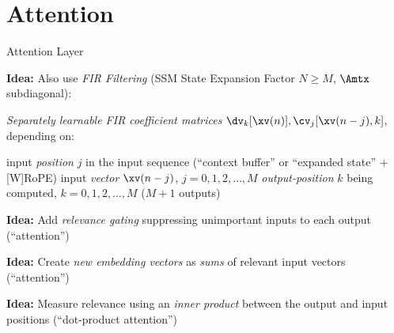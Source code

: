 \section[\sectopts,toc={Attention}]{Attention}

\begin{slide}[\slideopts,toc={Attention}]{Attention Layer}

\vspace{-1em}

\textbf{Idea:} Also use \emph{FIR Filtering} (SSM State Expansion Factor $N\ge M$, $\Amtx$ subdiagonal):



\vspace{-1em}

\emph{Separately learnable FIR coefficient matrices} $\dv_k[\xv(n)], \cv_j[\xv(n-j),k]$, depending on:
  \begin{enumerate}
    \mpitem input \emph{position} $j$ in the input sequence (``context buffer'' or ``expanded state'' + [W]RoPE)
    \mpitem input \emph{vector} $\xv(n-j)$,\; $j=0,1,2,\dots,M$
    \mpitem \emph{output-position} $k$ being computed,\; $k=0,1,2,\dots,M$ ($M+1$ outputs)
  \end{enumerate}

\maybepause
\textbf{Idea:} Add \emph{relevance gating} suppressing unimportant inputs to each output (``attention'')

\vspace{0.2em}

\maybepause
\textbf{Idea:} Create \emph{new embedding vectors} as \emph{sums} of relevant input vectors (``attention'')

\vspace{0.2em}

\maybepause
\textbf{Idea:} Measure relevance using an \emph{inner product} between the output and input positions (``dot-product attention'')
\end{slide}

